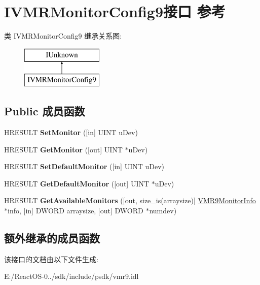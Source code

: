 \hypertarget{interface_i_v_m_r_monitor_config9}{}\section{I\+V\+M\+R\+Monitor\+Config9接口 参考}
\label{interface_i_v_m_r_monitor_config9}
类 I\+V\+M\+R\+Monitor\+Config9 继承关系图\+:\begin{figure}[H]
\begin{center}
\leavevmode
\includegraphics[height=2.000000cm]{interface_i_v_m_r_monitor_config9}
\end{center}
\end{figure}
\subsection*{Public 成员函数}
\begin{DoxyCompactItemize}
\item 
\mbox{\label{interface_i_v_m_r_monitor_config9_a930d0e780dfc8dc2e6f6b264f7fcddbf}} 
H\+R\+E\+S\+U\+LT {\bfseries Set\+Monitor} (\mbox{[}in\mbox{]} U\+I\+NT u\+Dev)
\item 
\mbox{\label{interface_i_v_m_r_monitor_config9_ac1d89939ea97de9d118186d29dbe3c8a}} 
H\+R\+E\+S\+U\+LT {\bfseries Get\+Monitor} (\mbox{[}out\mbox{]} U\+I\+NT $\ast$u\+Dev)
\item 
\mbox{\label{interface_i_v_m_r_monitor_config9_a5587419ab398adf101e30292fb72e733}} 
H\+R\+E\+S\+U\+LT {\bfseries Set\+Default\+Monitor} (\mbox{[}in\mbox{]} U\+I\+NT u\+Dev)
\item 
\mbox{\label{interface_i_v_m_r_monitor_config9_a3a8bf178e18c17068ec15df492a07fc0}} 
H\+R\+E\+S\+U\+LT {\bfseries Get\+Default\+Monitor} (\mbox{[}out\mbox{]} U\+I\+NT $\ast$u\+Dev)
\item 
\mbox{\label{interface_i_v_m_r_monitor_config9_a6befdf3f78411daa363ff983136b7f06}} 
H\+R\+E\+S\+U\+LT {\bfseries Get\+Available\+Monitors} (\mbox{[}out, size\+\_\+is(arraysize)\mbox{]} \hyperlink{struct___v_m_r9_monitor_info}{V\+M\+R9\+Monitor\+Info} $\ast$info, \mbox{[}in\mbox{]} D\+W\+O\+RD arraysize, \mbox{[}out\mbox{]} D\+W\+O\+RD $\ast$numdev)
\end{DoxyCompactItemize}
\subsection*{额外继承的成员函数}


该接口的文档由以下文件生成\+:\begin{DoxyCompactItemize}
\item 
E\+:/\+React\+O\+S-\/0../sdk/include/psdk/vmr9.\+idl\end{DoxyCompactItemize}

